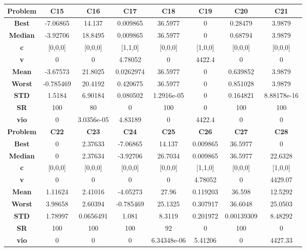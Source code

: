 \documentclass{IEEEtran}
\begin{document}
\begin{center}
\begin{tabular}{|c|c|c|c|c|c|c|c|}
    \hline 
    \hline 
    \textbf{Problem} & \textbf{C15} & \textbf{C16} & \textbf{C17} & \textbf{C18} & \textbf{C19} & \textbf{C20} & \textbf{C21} \\ 
    \hline\hline 
    \textbf{Best} & -7.06865 & 14.137 & 0.009865 & 36.5977 & 0 & 0.28479 & 3.9879\\ 
    \textbf{Median} & -3.92706 & 18.8495 & 0.009865 & 36.5977 & 0 & 0.68794 & 3.9879\\ 
    \textbf{c} & [0,0,0] & [0,0,0] & [1,1,0] & [0,0,0] & [1,0,0] & [0,0,0] & [0,0,0]\\ 
    \textbf{v} & 0 & 0 & 4.78052 & 0 & 4422.4 & 0 & 0\\ 
    \textbf{Mean} & -3.67573 & 21.8025 & 0.0262974 & 36.5977 & 0 & 0.639852 & 3.9879\\ 
    \textbf{Worst} & -0.785469 & 20.4192 & 0.420675 & 36.5977 & 0 & 0.851028 & 3.9879\\ 
    \textbf{STD} & 1.5184 & 6.90184 & 0.080502 & 1.2916e-05 & 0 & 0.164821 & 8.88178e-16\\ 
    \textbf{SR} & 100 & 80 & 0 & 100 & 0 & 100 & 100\\ 
    \textbf{vio} & 0 & 3.0356e-05 & 4.83189 & 0 & 4422.4 & 0 & 0\\ 
    \hline 
    \hline 
    \textbf{Problem} & \textbf{C22} & \textbf{C23} & \textbf{C24} & \textbf{C25} & \textbf{C26} & \textbf{C27} & \textbf{C28} \\ 
    \hline\hline 
    \textbf{Best} & 0 & 2.37633 & -7.06865 & 14.137 & 0.009865 & 36.5977 & 0\\ 
    \textbf{Median} & 0 & 2.37634 & -3.92706 & 26.7034 & 0.009865 & 36.5977 & 22.6328\\ 
    \textbf{c} & [0,0,0] & [0,0,0] & [0,0,0] & [0,0,0] & [1,1,0] & [0,0,0] & [1,0,0]\\ 
    \textbf{v} & 0 & 0 & 0 & 0 & 4.78052 & 0 & 4429.07\\ 
    \textbf{Mean} & 1.11624 & 2.41016 & -4.05273 & 27.96 & 0.119203 & 36.598 & 12.5292\\ 
    \textbf{Worst} & 3.98658 & 2.60394 & -0.785469 & 25.1325 & 0.307917 & 36.6048 & 25.0503\\ 
    \textbf{STD} & 1.78997 & 0.0656491 & 1.081 & 8.3119 & 0.201972 & 0.00139309 & 8.48292\\ 
    \textbf{SR} & 100 & 100 & 100 & 92 & 0 & 100 & 0\\ 
    \textbf{vio} & 0 & 0 & 0 & 6.34348e-06 & 5.41206 & 0 & 4427.33\\ 
    \hline 
  \end{tabular}
\end{center}
\newpage
\end{document}
